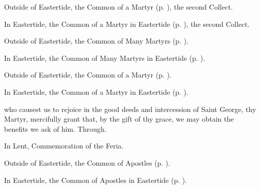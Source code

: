 \begin{rubric}
	Outside of Eastertide, the Common of a Martyr (p. \pageref{CommonMartyr}), the second Collect.
\end{rubric}

\begin{rubric}
	In Eastertide, the Common of a Martyr in Eastertide (p. \pageref{CommonMartyrEaster}), the second Collect.
\end{rubric}



\begin{rubric}
	Outside of Eastertide, the Common of Many Martyrs (p. \pageref{CommonMartyrs}).
\end{rubric}

\begin{rubric}
	In Eastertide, the Common of Many Martyrs in Eastertide (p. \pageref{CommonMartyrsEaster}).
\end{rubric}



\begin{rubric}
	Outside of Eastertide, the Common of a Martyr (p. \pageref{CommonMartyr}).
\end{rubric}

\begin{rubric}
	In Eastertide, the Common of a Martyr in Eastertide (p. \pageref{CommonMartyrEaster}).
\end{rubric}

{} who causest us to rejoice in the good deeds and intercession of Saint George, thy Martyr, mercifully grant that, by the gift of thy grace, we may obtain the benefits we ask of him. Through.
\begin{rubric}
    In Lent, Commemoration of the Feria.%
\end{rubric}



\begin{rubric}
	Outside of Eastertide, the Common of Apostles (p. \pageref{CommonApostles}).
\end{rubric}

\begin{rubric}
	In Eastertide, the Common of Apostles in Eastertide (p. \pageref{CommonApostlesEaster}).
\end{rubric}


